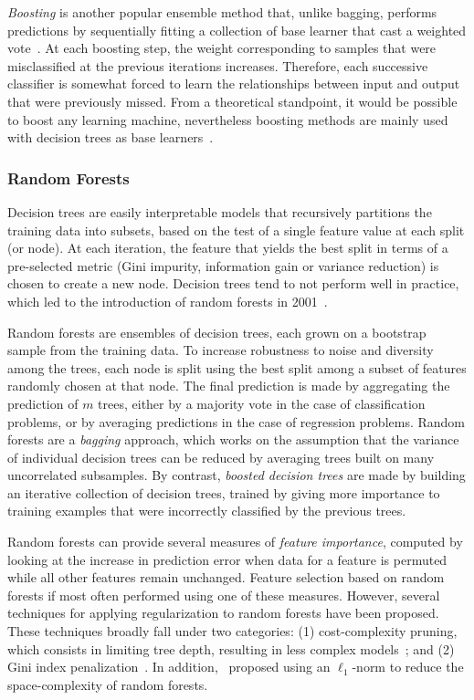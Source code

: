 	    \textit{Boosting} is another popular ensemble method that, unlike bagging, performs predictions by sequentially fitting a collection of base learner that cast a weighted vote~\citep{hastie2009elements}. At each boosting step, the weight corresponding to samples that were misclassified at the previous iterations increases. Therefore, each successive classifier is somewhat forced to learn the relationships between input and output that were previously missed. From a theoretical standpoint, it would be possible to boost any learning machine, nevertheless boosting methods are mainly used with decision trees as base learners~\cite{hastie2009elements}.

	    \subsubsection{Random Forests}
	    Decision trees are easily interpretable models that recursively partitions the training data into subsets, based on the test of a single feature value at each split (or node). At each iteration, the feature that yields the best split in terms of a pre-selected metric (Gini impurity, information gain or variance reduction) is chosen to create a new node. Decision trees tend to not perform well in practice, which led to the introduction of random forests in 2001~\cite{breiman2001random}.

	    Random forests are ensembles of decision trees, each grown on a bootstrap sample from the training data.
	    To increase robustness to noise and diversity among the trees, each node is split using the best split among a subset of features randomly chosen at that node.
	    The final prediction is made by aggregating the prediction of $m$ trees, either by a majority vote in the case of classification problems, or by averaging predictions in the case of regression problems.
	    Random forests are a {\it bagging} approach, which works on the assumption that the variance of individual decision trees can be reduced by averaging trees built on many uncorrelated subsamples.
	    By contrast, {\it boosted decision trees} are made by building an iterative collection of decision trees, trained by giving more importance to training examples that were incorrectly classified by the previous trees. 

	    Random forests can provide several measures of {\it feature importance}, computed by looking at the increase in prediction error %
	    when data for a feature is permuted while all other features remain unchanged. Feature selection based on random forests if most often performed using one of these measures. However, several techniques for applying regularization to random forests have been proposed. These techniques broadly fall under two categories: (1) cost-complexity pruning, which consists in limiting tree depth, resulting in less complex models~\cite{ishwaran2008random,kulkarni2012pruning}; and (2) Gini index penalization~\cite{deng2013gene, liu2014learning}. In addition,~\cite{joly2012ell1} proposed using an $\ell_1$-norm  to reduce the space-complexity of random forests.

